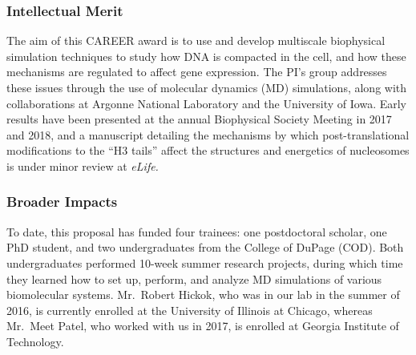 \documentclass[11pt]{NSFamsart}
\begin{document}
\subsubsection{Intellectual Merit} The aim of this CAREER award is to use and develop multiscale biophysical simulation techniques to study how DNA is compacted in the cell, and how these mechanisms are regulated to affect gene expression.  The PI's group addresses these issues through the use of molecular dynamics (MD) simulations, along with collaborations at Argonne National Laboratory and the University of Iowa.  Early results have been presented at the annual Biophysical Society Meeting in 2017 and 2018, and a manuscript detailing the mechanisms by which post-translational modifications to the ``H3 tails'' affect the structures and energetics of nucleosomes is under minor review at \textit{eLife.} 

\subsubsection{Broader Impacts} To date, this proposal has funded four trainees: one postdoctoral scholar, one PhD student, and two undergraduates from the College of DuPage (COD).  Both undergraduates performed 10-week summer research projects, during which time they learned how to set up, perform, and analyze MD simulations of various biomolecular systems. Mr.~Robert Hickok, who was in our lab in the summer of 2016, is currently enrolled at the University of Illinois at Chicago, whereas Mr.~Meet Patel, who worked with us in 2017, is enrolled at Georgia Institute of Technology.  


\end{document}
